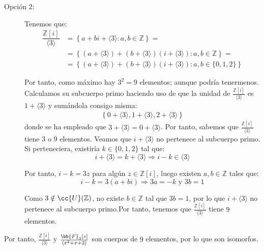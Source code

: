 \begin{ejercicio}
\begin{description}
        \item[Opción 2:] Tenemos que:
        \begin{align*}
            \dfrac{\mathbb{Z}[i]}{\langle 3 \rangle } &= \left\{a+bi + \langle 3 \rangle : a,b\in \mathbb{Z}\right\}
            =\\&= \left\{(a+\langle 3 \rangle) + (b+\langle 3 \rangle)(i+\langle 3 \rangle) : a,b\in \mathbb{Z}\right\}
            =\\&= \left\{(a+\langle 3 \rangle) + (b+\langle 3 \rangle)(i+\langle 3 \rangle) : a,b\in \{0,1,2\}\right\}
        \end{align*}

        Por tanto, como máximo hay $3^2 = 9$ elementos; aunque podría tenermenos. Calculamos su subcuerpo primo haciendo uso de que la unidad de $\frac{\mathbb{Z}[i]}{\langle 3 \rangle }$ es $1+\langle 3 \rangle$ y sumándola consigo misma:
        \begin{align*}
            \left\{0+\langle 3 \rangle, 1+\langle 3 \rangle, 2+\langle 3 \rangle\right\}
        \end{align*}
        donde se ha empleado que $3+\langle 3 \rangle = 0+\langle 3 \rangle$. Por tanto, sabemos que $\frac{\mathbb{Z}[i]}{\langle 3 \rangle }$ tiene $3$ o $9$ elementos. Veamos que $i+\langle 3 \rangle$ no pertenece al subcuerpo primo. Si perteneciera, existiría $k\in \{0,1,2\}$ tal que:
        \begin{equation*}
            i+\langle 3 \rangle = k + \langle 3 \rangle \Longrightarrow i-k \in \langle 3 \rangle
        \end{equation*}

        Por tanto, $i-k = 3z$ para algún $z\in \mathbb{Z}[i]$, luego existen $a,b\in \mathbb{Z}$ tales que:
        \begin{equation*}
            i-k = 3(a+bi) \Longrightarrow 3a = -k \text{ y } 3b = 1
        \end{equation*}

        Como $3\notin \cc{U}(\mathbb{Z})$, no existe $b\in \mathbb{Z}$ tal que $3b = 1$, por lo que $i+\langle 3 \rangle$ no pertenece al subcuerpo primo.Por tanto, tenemos que $\frac{\mathbb{Z}[i]}{\langle 3 \rangle }$ tiene $9$ elementos.
    \end{description}

    \noindent
    Por tanto, $\frac{\mathbb{Z}[i]}{\langle 3 \rangle }$ y $\frac{\bb{F}_3[x]}{\langle x^2+x+2 \rangle }$ son cuerpos de $9$ elementos, por lo que son isomorfos.\\


\end{ejercicio}
